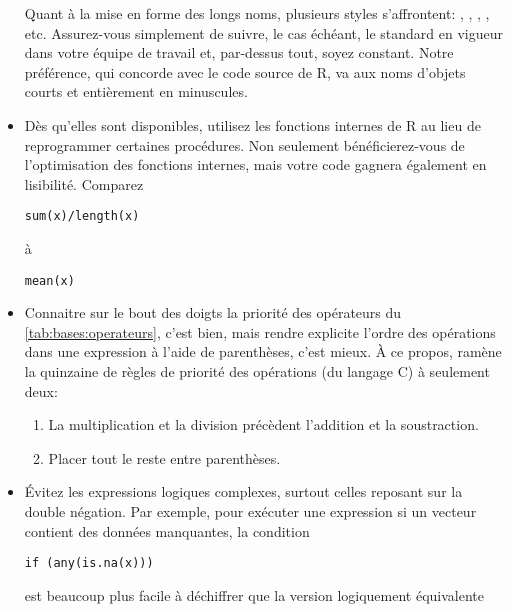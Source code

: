 \begin{itemize}
  Quant à la mise en forme des longs noms, plusieurs styles
  s'affrontent: , ,
  , , etc. Assurez-vous
  simplement de suivre, le cas échéant, le standard en vigueur dans
  votre équipe de travail et, par-dessus tout, soyez constant. Notre
  préférence, qui concorde avec le code source de R, va aux noms
  d'objets courts et entièrement en minuscules.
\item Dès qu'elles sont disponibles, utilisez les fonctions internes
  de R au lieu de reprogrammer certaines procédures. Non seulement
  bénéficierez-vous de l'optimisation des fonctions internes, mais
  votre code gagnera également en lisibilité. Comparez
  \begin{Schunk}
\begin{Verbatim}
sum(x)/length(x)
\end{Verbatim}
  \end{Schunk}
  à
  \begin{Schunk}
\begin{Verbatim}
mean(x)
\end{Verbatim}
  \end{Schunk}
\item Connaitre sur le bout des doigts la priorité des opérateurs du
  \autoref{tab:bases:operateurs}, c'est bien, mais rendre explicite
  l'ordre des opérations dans une expression à l'aide de parenthèses,
  c'est mieux. À ce propos, \citet{Oualline:C:1997} ramène la
  quinzaine de règles de priorité des opérations (du langage C) à
  seulement deux:
  \begin{enumerate}
  \item La multiplication et la division précèdent l'addition et la
    soustraction.
  \item Placer tout le reste entre parenthèses.
  \end{enumerate}
\item Évitez les expressions logiques complexes, surtout celles
  reposant sur la double négation. Par exemple, pour exécuter une
  expression si un vecteur contient des données manquantes, la
  condition
  \begin{Schunk}
\begin{Verbatim}
if (any(is.na(x)))
\end{Verbatim}
  \end{Schunk}
  est beaucoup plus facile à déchiffrer que la version logiquement
  équivalente
  \begin{Schunk}
\begin{Verbatim}

\end{Verbatim}
\end{Schunk}
\end{itemize}
